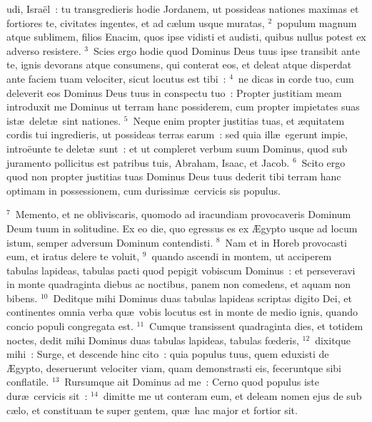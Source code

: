 \bchapter
{}udi, Isra\"el~: tu transgredieris hodie Jordanem, ut possideas nationes maximas et fortiores te, civitates ingentes, et ad c\ae lum usque muratas,
${}^{2}$~populum magnum atque sublimem, filios Enacim, quos ipse vidisti et audisti, quibus nullus potest ex adverso resistere.
${}^{3}$~Scies ergo hodie quod Dominus Deus tuus ipse transibit ante te, ignis devorans atque consumens, qui conterat eos, et deleat atque disperdat ante faciem tuam velociter, sicut locutus est tibi~:
${}^{4}$~ne dicas in corde tuo, cum deleverit eos Dominus Deus tuus in conspectu tuo~: Propter justitiam meam introduxit me Dominus ut terram hanc possiderem, cum propter impietates suas ist\ae\ delet\ae\ sint nationes.
${}^{5}$~Neque enim propter justitias tuas, et \ae quitatem cordis tui ingredieris, ut possideas terras earum~: sed quia ill\ae\ egerunt impie, intro\"eunte te delet\ae\ sunt~: et ut compleret verbum suum Dominus, quod sub juramento pollicitus est patribus tuis, Abraham, Isaac, et Jacob.
${}^{6}$~Scito ergo quod non propter justitias tuas Dominus Deus tuus dederit tibi terram hanc optimam in possessionem, cum durissim\ae\ cervicis sis populus.


${}^{7}$~Memento, et ne obliviscaris, quomodo ad iracundiam provocaveris Dominum Deum tuum in solitudine. Ex eo die, quo egressus es ex \AE gypto usque ad locum istum, semper adversum Dominum contendisti.
${}^{8}$~Nam et in Horeb provocasti eum, et iratus delere te voluit,
${}^{9}$~quando ascendi in montem, ut acciperem tabulas lapideas, tabulas pacti quod pepigit vobiscum Dominus~: et perseveravi in monte quadraginta diebus ac noctibus, panem non comedens, et aquam non bibens.
${}^{10}$~Deditque mihi Dominus duas tabulas lapideas scriptas digito Dei, et continentes omnia verba qu\ae\ vobis locutus est in monte de medio ignis, quando concio populi congregata est.
${}^{11}$~Cumque transissent quadraginta dies, et totidem noctes, dedit mihi Dominus duas tabulas lapideas, tabulas fœderis,
${}^{12}$~dixitque mihi~: Surge, et descende hinc cito~: quia populus tuus, quem eduxisti de \AE gypto, deseruerunt velociter viam, quam demonstrasti eis, feceruntque sibi conflatile.
${}^{13}$~Rursumque ait Dominus ad me~: Cerno quod populus iste dur\ae\ cervicis sit~:
${}^{14}$~dimitte me ut conteram eum, et deleam nomen ejus de sub c\ae lo, et constituam te super gentem, qu\ae\ hac major et fortior sit.


